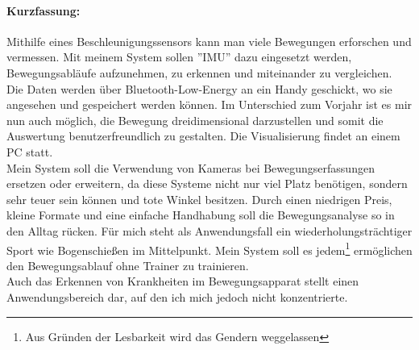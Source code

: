 \paragraph{Kurzfassung:}
Mithilfe eines Beschleunigungssensors kann man viele Bewegungen erforschen und vermessen. 
Mit meinem System sollen ''IMU'' dazu eingesetzt werden, Bewegungsabläufe aufzunehmen, zu erkennen und miteinander zu vergleichen.\\
Die Daten werden über Bluetooth-Low-Energy an ein Handy geschickt, wo sie angesehen und gespeichert 
werden können. Im Unterschied zum Vorjahr ist es mir nun auch möglich, die Bewegung dreidimensional 
darzustellen und somit die Auswertung benutzerfreundlich zu gestalten. Die Visualisierung findet an 
einem PC statt.\\
Mein System soll die Verwendung von Kameras bei Bewegungserfassungen ersetzen oder erweitern, da diese Systeme 
nicht nur viel Platz benötigen, sondern sehr teuer sein können und tote Winkel besitzen. 
Durch einen niedrigen Preis, kleine Formate und eine einfache Handhabung soll die Bewegungsanalyse 
so in den Alltag rücken. Für mich steht als Anwendungsfall ein wiederholungsträchtiger Sport wie 
Bogenschießen im Mittelpunkt. Mein System soll es jedem\footnote{Aus Gründen der Lesbarkeit wird das Gendern weggelassen} 
ermöglichen den Bewegungsablauf ohne Trainer zu trainieren.\\
Auch das Erkennen von Krankheiten im Bewegungsapparat stellt einen Anwendungsbereich dar, auf den ich mich jedoch nicht konzentrierte.